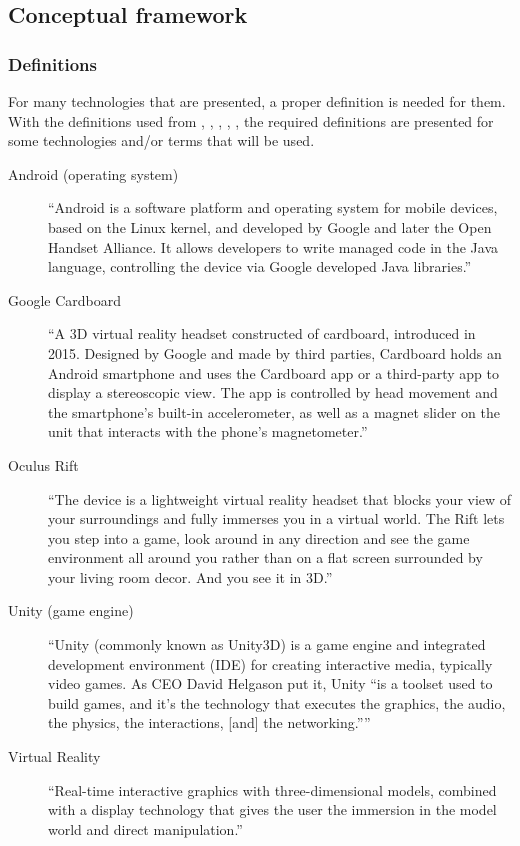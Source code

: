 \documentclass[preprint,12pt]{elsarticle}
\begin{document}
	\subsection{Conceptual framework}
		\subsubsection{Definitions}
		For many technologies that are presented, a proper definition
		is needed for them. With the definitions used from
		\citet*{AndroidOS}, \citet*{GoogleCardboard},
		\citet*{OculusRift}, \citet*{UnityEngine},
		\citet*{VirtualReality}, the required definitions are presented
		for some technologies and/or terms that will be used.
		\begin{description}
			\item[Android (operating system)]
				``Android is a software platform and 
				operating system for mobile devices, 
				based on the Linux kernel, and developed 
				by Google and later the Open Handset 
				Alliance. It allows developers to write 
				managed code in the Java language, 
				controlling the device via Google
				developed Java libraries.'' \cite{AndroidOS}
			\item[Google Cardboard]
				``A 3D virtual reality headset constructed of
				cardboard, introduced in 2015. Designed by
				Google and made by third parties, Cardboard
				holds an Android smartphone and uses the
				Cardboard app or a third-party app to display
				a stereoscopic view. The app is controlled by
				head movement and the smartphone's built-in
				accelerometer, as well as a magnet slider on
				the unit that interacts with the phone's
				magnetometer.'' \cite{GoogleCardboard}
			\item[Oculus Rift]
				``The device 
				is a lightweight virtual reality headset that
				blocks your view of your surroundings and fully
				immerses you in a virtual world. The Rift lets
				you step into a game, look around in any
				direction and see the game environment all
				around you rather than on a flat screen
				surrounded by your living room decor. And you
				see it in 3D.'' \cite{OculusRift}
			\item[Unity (game engine)]
				``Unity (commonly known as Unity3D) is a game
				engine and integrated development environment
				(IDE) for creating interactive media, typically
				video games. As CEO David Helgason put it,
				Unity ``is a toolset used to build games, and
				it’s the technology that executes the graphics,
				the audio, the physics, the interactions,
				[and] the networking.'''' \cite{UnityEngine}
			\item[Virtual Reality]
				``Real-time interactive  graphics
				with three-dimensional models, combined with a
				display technology that gives the user the
				immersion in the model world and direct
				manipulation.'' \cite{VirtualReality}
		\end{description}
\end{document}
